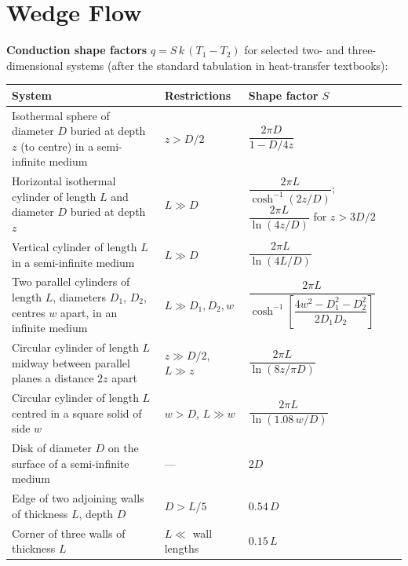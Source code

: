 \section*{Wedge Flow}
%
\noindent\textbf{Conduction shape factors} $q = S\,k\,(T_1 - T_2)$ for selected two- and three-dimensional systems
(after the standard tabulation in heat-transfer textbooks):

\begin{center}
\renewcommand{\arraystretch}{1.6}
\begin{tabular}{p{6.2cm} p{3.2cm} p{5cm}}
\hline
\textbf{System} & \textbf{Restrictions} & \textbf{Shape factor $S$} \\
\hline
Isothermal sphere of diameter $D$ buried at depth $z$ (to centre) in a semi-infinite medium & $z > D/2$ & $\dfrac{2\pi D}{1 - D/4z}$ \\
Horizontal isothermal cylinder of length $L$ and diameter $D$ buried at depth $z$ & $L \gg D$ & $\dfrac{2\pi L}{\cosh^{-1}(2z/D)}$; \; $\dfrac{2\pi L}{\ln(4z/D)}$ for $z > 3D/2$ \\
Vertical cylinder of length $L$ in a semi-infinite medium & $L \gg D$ & $\dfrac{2\pi L}{\ln(4L/D)}$ \\
Two parallel cylinders of length $L$, diameters $D_1$, $D_2$, centres $w$ apart, in an infinite medium & $L \gg D_1, D_2, w$ & $\dfrac{2\pi L}{\cosh^{-1}\!\left[\dfrac{4w^2 - D_1^2 - D_2^2}{2D_1D_2}\right]}$ \\
Circular cylinder of length $L$ midway between parallel planes a distance $2z$ apart & $z \gg D/2$, $L \gg z$ & $\dfrac{2\pi L}{\ln(8z/\pi D)}$ \\
Circular cylinder of length $L$ centred in a square solid of side $w$ & $w > D$, $L \gg w$ & $\dfrac{2\pi L}{\ln(1.08\,w/D)}$ \\
Disk of diameter $D$ on the surface of a semi-infinite medium & --- & $2D$ \\
Edge of two adjoining walls of thickness $L$, depth $D$ & $D > L/5$ & $0.54\,D$ \\
Corner of three walls of thickness $L$ & $L \ll$ wall lengths & $0.15\,L$ \\
\hline
\end{tabular}
\end{center}
